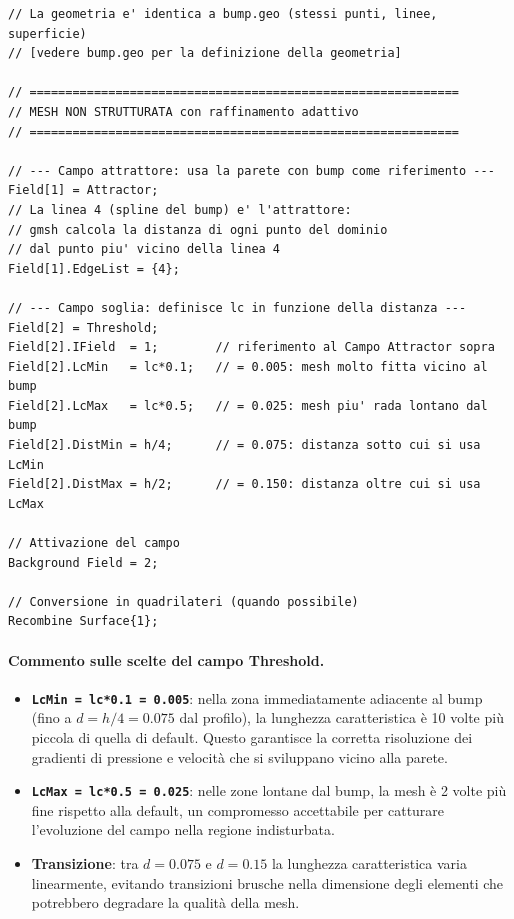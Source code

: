 \begin{lstlisting}[style=gmsh, caption={File \texttt{bump\_unstr.geo} -- mesh non strutturata con Attractor/Threshold.}, label={lst:bump_unstr}]
// La geometria e' identica a bump.geo (stessi punti, linee, superficie)
// [vedere bump.geo per la definizione della geometria]

// ============================================================
// MESH NON STRUTTURATA con raffinamento adattivo
// ============================================================

// --- Campo attrattore: usa la parete con bump come riferimento ---
Field[1] = Attractor;
// La linea 4 (spline del bump) e' l'attrattore:
// gmsh calcola la distanza di ogni punto del dominio
// dal punto piu' vicino della linea 4
Field[1].EdgeList = {4};

// --- Campo soglia: definisce lc in funzione della distanza ---
Field[2] = Threshold;
Field[2].IField  = 1;        // riferimento al Campo Attractor sopra
Field[2].LcMin   = lc*0.1;   // = 0.005: mesh molto fitta vicino al bump
Field[2].LcMax   = lc*0.5;   // = 0.025: mesh piu' rada lontano dal bump
Field[2].DistMin = h/4;      // = 0.075: distanza sotto cui si usa LcMin
Field[2].DistMax = h/2;      // = 0.150: distanza oltre cui si usa LcMax

// Attivazione del campo
Background Field = 2;

// Conversione in quadrilateri (quando possibile)
Recombine Surface{1};
\end{lstlisting}

\paragraph{Commento sulle scelte del campo Threshold.}
\begin{itemize}
  \item \textbf{\texttt{LcMin = lc*0.1 = 0.005}}: nella zona immediatamente adiacente al bump
    (fino a $d = h/4 = 0.075$ dal profilo), la lunghezza caratteristica è 10 volte più piccola
    di quella di default. Questo garantisce la corretta risoluzione dei gradienti di pressione
    e velocità che si sviluppano vicino alla parete.
  \item \textbf{\texttt{LcMax = lc*0.5 = 0.025}}: nelle zone lontane dal bump, la mesh è 2 volte
    più fine rispetto alla default, un compromesso accettabile per catturare l'evoluzione del
    campo nella regione indisturbata.
  \item \textbf{Transizione}: tra $d = 0.075$ e $d = 0.15$ la lunghezza caratteristica varia
    linearmente, evitando transizioni brusche nella dimensione degli elementi che potrebbero
    degradare la qualità della mesh.
\end{itemize}

